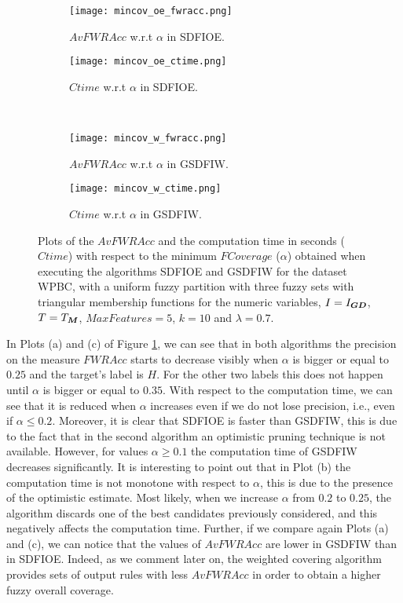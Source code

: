 \begin{figure}[H]
	\centering
	\begin{subfigure}{.4\textwidth}
		\centering
		\texttt{[image: mincov\_oe\_fwracc.png]}
		\caption{$AvFWRAcc$ w.r.t $\alpha$ in SDFIOE.}
	\end{subfigure}\hspace{0.5cm}
	\begin{subfigure}{.4\textwidth}
		\centering
		\texttt{[image: mincov\_oe\_ctime.png]}
		\caption{$Ctime$ w.r.t $\alpha$ in SDFIOE.}
	\end{subfigure}\\
	\begin{subfigure}{.4\textwidth}
		\centering
		\texttt{[image: mincov\_w\_fwracc.png]}
		\caption{$AvFWRAcc$ w.r.t $\alpha$ in GSDFIW.}
	\end{subfigure}\hspace{0.5cm}
	\begin{subfigure}{.4\textwidth}
		\centering
		\texttt{[image: mincov\_w\_ctime.png]}
		\caption{$Ctime$ w.r.t $\alpha$ in GSDFIW.}
	\end{subfigure}
	\caption{Plots of the $AvFWRAcc$ and the computation time in seconds ($Ctime$) with respect to the minimum $FCoverage$ ($\alpha$) obtained when executing the algorithms SDFIOE and GSDFIW for the dataset WPBC, with a uniform fuzzy partition with three fuzzy sets with triangular membership functions for the numeric variables, $I=I_{\bm{GD}}$, $T=T_{\bm{M}}$, $MaxFeatures =5$, $k=10$ and $\lambda = 0.7$.}
	\label{fig:SD:1}
\end{figure}

 In Plots (a) and (c) of Figure \ref{fig:SD:1}, we can see that in both algorithms the precision on the measure $FWRAcc$ starts to decrease visibly when $\alpha$ is bigger or equal to $0.25$ and the target's label is $H$. For the other two labels this does not happen until $\alpha$ is bigger or equal to $0.35$. With respect to the computation time, we can see that it is reduced when $\alpha$ increases even if we do not lose precision, i.e., even if $\alpha \leq 0.2$. Moreover, it is clear that SDFIOE is faster than GSDFIW, this is due to the fact that in the second algorithm an optimistic pruning technique is not available. However, for values $\alpha \geq 0.1$ the computation time of GSDFIW decreases significantly. It is interesting to point out that in Plot (b) the computation time is not monotone with respect to $\alpha$, this is due to the presence  of the optimistic estimate. Most likely, when we increase $\alpha$ from $0.2$ to $0.25$, the algorithm discards one of the best candidates previously considered, and this negatively affects the computation time. Further, if we compare again Plots (a) and (c), we can notice that the values of $AvFWRAcc$ are lower in GSDFIW than in SDFIOE. Indeed, as we comment later on, the weighted covering algorithm provides sets of output rules with less $AvFWRAcc$ in order to obtain a higher fuzzy overall coverage. 
 
